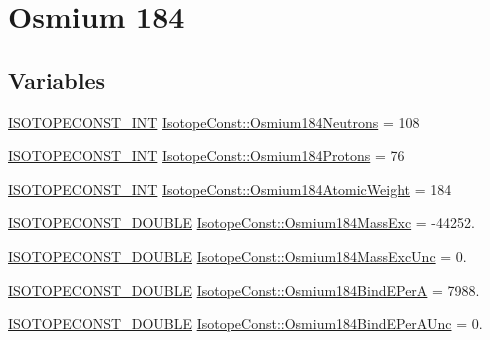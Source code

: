 \hypertarget{group___isotope_const-_osmium-_os184}{}\section{Osmium 184}
\label{group___isotope_const-_osmium-_os184}
\subsection*{Variables}
\begin{DoxyCompactItemize}
\item 
\mbox{\hyperlink{group___isotope_const-_macros_ga5f18360b3e99483a35c32d789e62621c}{I\+S\+O\+T\+O\+P\+E\+C\+O\+N\+S\+T\+\_\+\+I\+NT}} \mbox{\hyperlink{group___isotope_const-_osmium-_os184_ga8b46bdde77c288cf507022a1cf920f9f}{Isotope\+Const\+::\+Osmium184\+Neutrons}} = 108
\item 
\mbox{\hyperlink{group___isotope_const-_macros_ga5f18360b3e99483a35c32d789e62621c}{I\+S\+O\+T\+O\+P\+E\+C\+O\+N\+S\+T\+\_\+\+I\+NT}} \mbox{\hyperlink{group___isotope_const-_osmium-_os184_ga3bc4f9be71500e5591e7b887f6f1d521}{Isotope\+Const\+::\+Osmium184\+Protons}} = 76
\item 
\mbox{\hyperlink{group___isotope_const-_macros_ga5f18360b3e99483a35c32d789e62621c}{I\+S\+O\+T\+O\+P\+E\+C\+O\+N\+S\+T\+\_\+\+I\+NT}} \mbox{\hyperlink{group___isotope_const-_osmium-_os184_ga36e4116f18b4cf6555d6ec2b642502e4}{Isotope\+Const\+::\+Osmium184\+Atomic\+Weight}} = 184
\item 
\mbox{\hyperlink{group___isotope_const-_macros_ga8f45a7272ce02c0b4c65c44636ed719a}{I\+S\+O\+T\+O\+P\+E\+C\+O\+N\+S\+T\+\_\+\+D\+O\+U\+B\+LE}} \mbox{\hyperlink{group___isotope_const-_osmium-_os184_ga6e545c259a1b4fcfd582305ac70510f2}{Isotope\+Const\+::\+Osmium184\+Mass\+Exc}} = -\/44252.
\item 
\mbox{\hyperlink{group___isotope_const-_macros_ga8f45a7272ce02c0b4c65c44636ed719a}{I\+S\+O\+T\+O\+P\+E\+C\+O\+N\+S\+T\+\_\+\+D\+O\+U\+B\+LE}} \mbox{\hyperlink{group___isotope_const-_osmium-_os184_gae64a340f8a9db7797ba20096bc93d4a3}{Isotope\+Const\+::\+Osmium184\+Mass\+Exc\+Unc}} = 0.
\item 
\mbox{\hyperlink{group___isotope_const-_macros_ga8f45a7272ce02c0b4c65c44636ed719a}{I\+S\+O\+T\+O\+P\+E\+C\+O\+N\+S\+T\+\_\+\+D\+O\+U\+B\+LE}} \mbox{\hyperlink{group___isotope_const-_osmium-_os184_ga6f1ae4764111f9808091c415b4d94be6}{Isotope\+Const\+::\+Osmium184\+Bind\+E\+PerA}} = 7988.
\item 
\mbox{\hyperlink{group___isotope_const-_macros_ga8f45a7272ce02c0b4c65c44636ed719a}{I\+S\+O\+T\+O\+P\+E\+C\+O\+N\+S\+T\+\_\+\+D\+O\+U\+B\+LE}} \mbox{\hyperlink{group___isotope_const-_osmium-_os184_gad9c5aa5349e6854cf09a06644e56771a}{Isotope\+Const\+::\+Osmium184\+Bind\+E\+Per\+A\+Unc}} = 0.

\end{DoxyCompactItemize}
